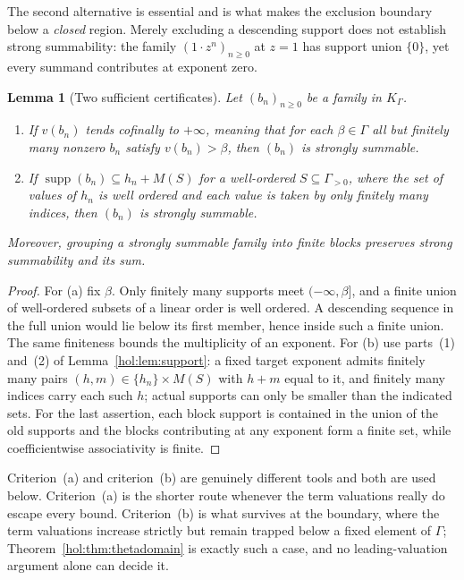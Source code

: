 \documentclass[11pt]{article}
\numberwithin{equation}{section}
\newtheorem{lemma}[theorem]{Lemma}
\theoremstyle{definition}
\theoremstyle{remark}
\newcommand{\K}{K_\Gamma}
\newcommand{\supp}{\operatorname{supp}}
\begin{document}
The second alternative is essential and is what makes the exclusion boundary
below a \emph{closed} region. Merely excluding a descending support does not
establish strong summability: the family $(1\cdot z^n)_{n\ge0}$ at $z=1$ has
support union $\{0\}$, yet every summand contributes at exponent zero.

\begin{lemma}[Two sufficient certificates]\label{hol:lem:certificate}
Let $(b_n)_{n\ge0}$ be a family in $\K$.
\begin{enumerate}[label=\textup{(\alph*)}]
\item If $v(b_n)$ tends cofinally to $+\infty$, meaning that for each
$\beta\in\Gamma$ all but finitely many nonzero $b_n$ satisfy $v(b_n)>\beta$,
then $(b_n)$ is strongly summable.
\item If $\supp(b_n)\subseteq h_n+M(S)$ for a well-ordered
$S\subseteq\Gamma_{>0}$, where the set of values of $h_n$ is well ordered and
each value is taken by only finitely many indices, then $(b_n)$ is strongly
summable.
\end{enumerate}
Moreover, grouping a strongly summable family into finite blocks preserves
strong summability and its sum.
\end{lemma}

\begin{proof}
For (a) fix $\beta$. Only finitely many supports meet $(-\infty,\beta]$, and a
finite union of well-ordered subsets of a linear order is well ordered. A
descending sequence in the full union would lie below its first member, hence
inside such a finite union. The same finiteness bounds the multiplicity of an
exponent. For (b) use parts~(1) and~(2) of Lemma~\ref{hol:lem:support}: a
fixed target exponent admits finitely many pairs $(h,m)\in\{h_n\}\times M(S)$
with $h+m$ equal to it, and finitely many indices carry each such $h$; actual
supports can only be smaller than the indicated sets. For the last assertion,
each block support is contained in the union of the old supports and the
blocks contributing at any exponent form a finite set, while coefficientwise
associativity is finite.
\end{proof}

Criterion~(a) and criterion~(b) are genuinely different tools and both are
used below. Criterion~(a) is the shorter route whenever the term valuations
really do escape every bound. Criterion~(b) is what survives at the boundary,
where the term valuations increase strictly but remain trapped below a fixed
element of $\Gamma$; Theorem~\ref{hol:thm:thetadomain} is exactly such a case,
and no leading-valuation argument alone can decide it.
\end{document}
